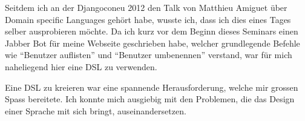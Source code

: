 
Seitdem ich an der Djangoconeu 2012 den Talk von Matthieu Amiguet über Domain specific Languages gehört habe, wusste ich, dass ich dies eines Tages selber ausprobieren möchte. Da ich kurz vor dem Beginn dieses Seminars einen Jabber Bot für meine Webseite geschrieben habe, welcher grundlegende Befehle wie ``Benutzer auflisten'' und ``Benutzer umbenennen'' verstand, war für mich naheliegend hier eine DSL zu verwenden.

Eine DSL zu kreieren war eine spannende Herausforderung, welche mir grossen Spass bereitete. Ich konnte mich ausgiebig mit den Problemen, die das Design einer Sprache mit sich bringt, auseinandersetzen.
